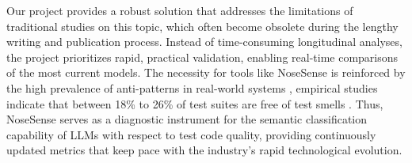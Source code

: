 \documentclass[sigconf]{acmart}
\begin{document}
Our project provides a robust solution that addresses the limitations of traditional studies on this topic, which often become obsolete during the lengthy writing and publication process. Instead of time-consuming longitudinal analyses, the project prioritizes rapid, practical validation, enabling real-time comparisons of the most current models. The necessity for tools like NoseSense is reinforced by the high prevalence of anti-patterns in real-world systems \cite{alves2025quality}, empirical studies indicate that between 18\% to 26\% of test suites are free of test smells \cite{Bavota2012,sast2026}. Thus, NoseSense serves as a diagnostic instrument for the semantic classification capability of LLMs with respect to test code quality, providing continuously updated metrics that keep pace with the industry's rapid technological evolution.
\end{document}
